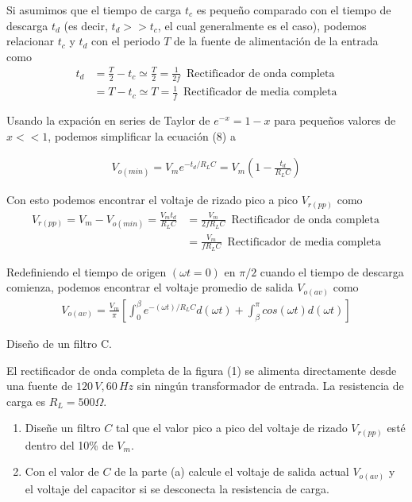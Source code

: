 \documentclass[12pt,a4paper]{article}
\begin{document}
	Si asumimos que el tiempo de carga $t_c$ es pequeño comparado con el tiempo de descarga $t_d$ (es decir, $t_d >> t_c$, el cual generalmente es el caso), podemos relacionar $t_c$ y $t_d$ con el periodo $T$ de la fuente de alimentación de la entrada como
	\begin{subequations}
		\begin{align}
			t_d &= \frac{T}{2} - t_c \simeq \frac{T}{2} = \frac{1}{2f}\,\,\, \text{Rectificador de onda completa} \\
			&= T - t_c \simeq T = \frac{1}{f}\,\,\, \text{Rectificador de media completa}
		\end{align}	
	\end{subequations}
	
	Usando la expación en series de Taylor de $e^{-x} = 1 - x$ para pequeños valores de $x<<1$, podemos simplificar la ecuación (8) a
	
	\begin{align}
		V_{o(min)} = V_m e^{-t_d/R_LC} =  V_m \left( 1 - \frac{t_d}{R_LC} \right)
	\end{align}
	
	Con esto podemos encontrar el voltaje de rizado pico a pico $V_{r(pp)}$ como
	\begin{subequations}
		\begin{align}
			V_{r(pp)} = V_m - V_{o(min)} = \frac{V_m t_d}{R_LC} &= \frac{V_m}{2fR_LC}\,\,\, \text{Rectificador de onda completa}\\
			&=\frac{V_m}{fR_LC}\,\,\, \text{Rectificador de media completa}
		\end{align}	
	\end{subequations}

	Redefiniendo el tiempo de origen $(\omega t = 0)$ en $\pi / 2$ cuando el tiempo de descarga comienza, podemos encontrar el voltaje promedio de salida $V_{o(av)}$ como
	\begin{align}
		V_{o(av)} = \frac{V_m}{\pi} \left[ \int_{0}^{\beta} e^{-(\omega t)/R_LC}d(\omega t) + \int_{\beta}^{\pi} cos (\omega t) d(\omega t) \right]\nonumber
	\end{align}
	
	\begin{myexample}
		Diseño de un filtro C.
		
		El rectificador de onda completa de la figura (1) se alimenta directamente desde una fuente de $120 \, V, 60 \, Hz$ sin ningún transformador de entrada. La resistencia de carga es $R_L = 500 \Omega$.
		\begin{enumerate}
			\item Diseñe un filtro $C$ tal que el valor pico a pico del voltaje de rizado $V_{r(pp)}$ esté dentro del 10\% de $V_m$.
			\item Con el valor de $C$ de la parte (a) calcule el voltaje de salida actual $V_{o(av)}$ y el voltaje del capacitor si se desconecta la resistencia de carga.
		\end{enumerate}
	
		
	\end{myexample}
\end{document}
